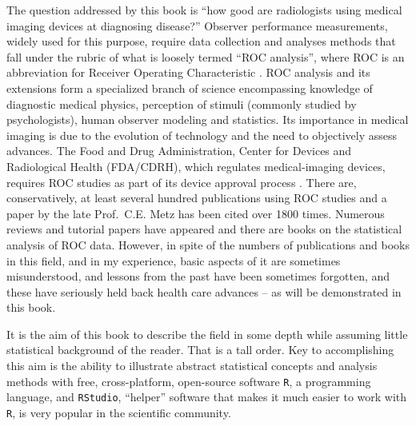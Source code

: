 \documentclass[
]{book}
\begin{document}
The question addressed by this book is ``how good are radiologists using medical imaging devices at diagnosing disease?'' Observer performance measurements, widely used for this purpose, require data collection and analyses methods that fall under the rubric of what is loosely termed ``ROC analysis'', where ROC is an abbreviation for Receiver Operating Characteristic \citep{metz1978rocmethodology}. ROC analysis and its extensions form a specialized branch of science encompassing knowledge of diagnostic medical physics, perception of stimuli (commonly studied by psychologists), human observer modeling and statistics. Its importance in medical imaging is due to the evolution of technology and the need to objectively assess advances. The Food and Drug Administration, Center for Devices and Radiological Health (FDA/CDRH), which regulates medical-imaging devices, requires ROC studies as part of its device approval process . There are, conservatively, at least several hundred publications using ROC studies and a paper \citep{metz1978rocmethodology} by the late Prof.~C.E. Metz has been cited over 1800 times. Numerous reviews and tutorial papers have appeared \citep[\citet{metz1989some}, \citet{kundel2008receiver}, \citet{metz1986rocmethodology}]{metz1978rocmethodology} and there are books on the statistical analysis \citep{RN1443} of ROC data. However, in spite of the numbers of publications and books in this field, and in my experience, basic aspects of it are sometimes misunderstood, and lessons from the past have been sometimes forgotten, and these have seriously held back health care advances -- as will be demonstrated in this book.

It is the aim of this book to describe the field in some depth while assuming little statistical background of the reader. That is a tall order. Key to accomplishing this aim is the ability to illustrate abstract statistical concepts and analysis methods with free, cross-platform, open-source software \texttt{R}, a programming language, and \texttt{RStudio}, ``helper'' software that makes it much easier to work with \texttt{R}, is very popular in the scientific community.
\end{document}
